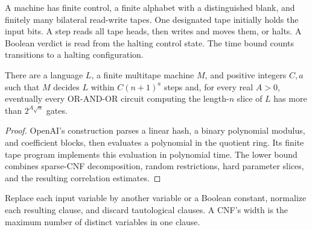 \begin{definition}
  \label{def:circuits-openai-multitape}
  \leanok
  A machine has finite control, a finite alphabet with a distinguished blank,
  and finitely many bilateral read-write tapes. One designated tape initially
  holds the input bits. A step reads all tape heads, then writes and moves
  them, or halts. A Boolean verdict is read from the halting control state.
  The time bound counts transitions to a halting configuration.
\end{definition}

\begin{theorem}
  \label{thm:circuits-openai-unrestricted-depth-three}
  \leanok
  There are a language $L$, a finite multitape machine $M$, and positive
  integers $C,a$ such that $M$ decides $L$ within $C(n+1)^a$ steps and,
  for every real $A>0$, eventually every OR-AND-OR circuit computing the
  length-$n$ slice of $L$ has more than $2^{A\sqrt n}$ gates.
\end{theorem}
\begin{proof}
  \leanok
  OpenAI's construction parses a linear hash, a binary polynomial modulus,
  and coefficient blocks, then evaluates a polynomial in the quotient ring.
  Its finite tape program implements this evaluation in polynomial time.
  The lower bound combines sparse-CNF decomposition, random restrictions,
  hard parameter slices, and the resulting correlation estimates.
\end{proof}

\begin{definition}
  \label{def:circuits-openai-cnf-substitution}
  \leanok
  Replace each input variable by another variable or a Boolean constant,
  normalize each resulting clause, and discard tautological clauses.
  A CNF's width is the maximum number of distinct variables in one clause.
\end{definition}


